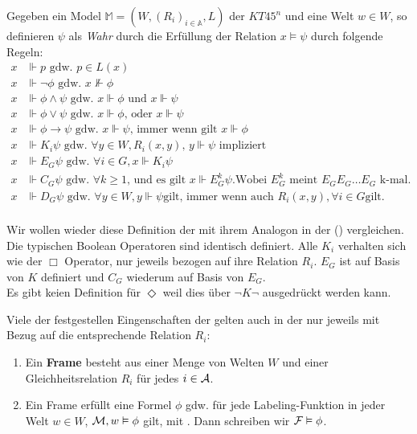 \begin{definition}
		Gegeben ein Model $\mathds{M} = (W,(R_i)_{i \in \mathds{A}}, L)$ der $KT45^n$ und eine Welt $w \in W$, so definieren $\psi$ als \emph{Wahr} durch die Erfüllung der Relation $x \vDash \psi$ durch folgende Regeln:
		\begin{align}
			x &\Vdash p\text{ gdw. }p \in L(x)\\
			x &\Vdash \neg \phi\text{ gdw. }x \nVdash \phi\\
			x &\Vdash \phi \wedge \psi\text{ gdw. }x \Vdash \phi\text{ und } x \Vdash \psi\\
			x &\Vdash \phi \vee \psi\text{ gdw. }x \Vdash \phi \text{, oder } x \Vdash \psi\\
			x &\Vdash \phi \rightarrow \psi\text{ gdw. }x \Vdash \psi\text{, immer wenn gilt }x \Vdash \phi\\
			x &\Vdash K_i\psi \text{ gdw. } \forall y \in W, R_i(x,y) \text{, } y \Vdash \psi \text{ impliziert}\\
			x &\Vdash E_G\psi \text{ gdw. } \forall i \in G, x \Vdash K_i\psi\\
			x &\Vdash C_G\psi \text{ gdw. } \forall k \geq 1 \text{, und es gilt } x \Vdash E^k_G\psi \text{.} \text{Wobei } E^k_G \text{ meint } E_{G}E_{G}\dots E_{G} \text{ k-mal.}\\
			x &\Vdash D_G\psi \text{ gdw. } \forall y \in W, y \Vdash \psi \text{gilt, immer wenn auch } R_i(x,y), \forall i \in G \text{gilt.}\\
		\end{align}
		\cite[S.337]{huth2004logic}
\end{definition}

Wir wollen wieder diese Definition der \MML mit ihrem Analogon in der \ML () vergleichen.
Die typischen Boolean Operatoren sind identisch definiert.
Alle $K_i$ verhalten sich wie der $\Box$ Operator, nur jeweils bezogen auf ihre Relation $R_i$.
$E_G$ ist auf Basis von $K$ definiert und $C_G$ wiederum auf Basis von $E_G$.\\
Es gibt keien Definition für $\Diamond$ weil dies über $\neg K \neg$ ausgedrückt werden kann.

Viele der festgestellen Eingenschaften der \ML gelten auch in der \MML nur jeweils mit Bezug auf die entsprechende Relation $R_i$:
\begin{enumerate}
	\item Ein \textbf{Frame} \MMFrameDef besteht aus einer Menge von Welten $W$ und einer Gleichheitsrelation $R_i$ für jedes $i \in \mathcal{A}$.
	\item Ein Frame \MMFrameDef erfüllt eine Formel $\phi$ gdw. für jede Labeling-Funktion \LabelFuncDef in jeder Welt $w \in W$, $\mathcal{M}, w \vDash \phi$ gilt, mit \MMModelDef. Dann schreiben wir $\mathcal{F} \vDash \phi$.
\end{enumerate}

